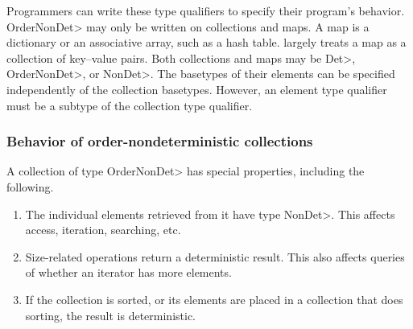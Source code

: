 Programmers can write these type qualifiers to specify their program's behavior.
\<OrderNonDet> may only be written on collections and maps.
A map is a dictionary or an associative array, such as a hash table.
\OurTypeSystem largely treats a map as a collection of key--value pairs.
Both collections and maps may be \<Det>, \<OrderNonDet>, or \<NonDet>.
The basetypes of their elements can be specified independently of the collection basetypes.
However, an element type qualifier must be a subtype of the collection type qualifier.

\subsubsection{Behavior of order-nondeterministic collections}\label{sec:ond-behavior}
A collection of type \<OrderNonDet> has special properties, including the following.

\begin{enumerate}
    \item
    The individual elements retrieved from it have type \<NonDet>.  This
    affects access, iteration, searching, etc.
    \item
    Size-related operations return a deterministic result.  This also affects
    queries of whether an iterator has more elements.
    \item
    If the collection is sorted, or its elements are placed in a collection
    that does sorting, the result is deterministic.
\end{enumerate}
